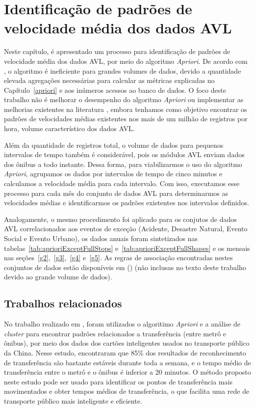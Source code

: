 \documentclass[
	12pt,				%
	oneside,			%
	a4paper,			%
	english,			%
	brazil				%
	]{abntex2ppgsi}
\begin{document}
{{{\section{Identificação de padrões de velocidade média dos dados AVL}
\label{expApriori}
Neste capítulo, é apresentado um processo para identificação de padrões de velocidade média dos dados AVL, por meio do algoritmo \textit{Apriori}. De acordo com \cite{xie2008optimization}, o algoritmo é ineficiente para grandes volumes de dados, devido a quantidade elevada agregações necessárias para calcular as métricas explicadas no Capítulo~\ref{apriori} e aos inúmeros acessos ao banco de dados. O foco deste trabalho não é melhorar o desempenho do algoritmo \textit{Apriori} ou implementar as melhorias existentes na literatura \cite{xie2008optimization, zhang2014method}, embora tenhamos como objetivo encontrar os padrões de velocidades médias existentes nos mais de um milhão de registros por hora, volume característico dos dados AVL.

Além da quantidade de registros total, o volume de dados para pequenos intervalos de tempo também é considerável, pois os módulos AVL enviam dados dos ônibus a todo instante. Dessa forma, para viabilizarmos o uso do algoritmo \textit{Apriori}, agrupamos os dados por intervalos de tempo de cinco minutos e calculamos a velocidade média para cada intervalo. Com isso, executamos esse processo para cada mês do conjunto de dados AVL para determinarmos as velocidades médias e identificarmos os padrões existentes nos intervalos definidos.

Analogamente, o mesmo procedimento foi aplicado para os conjutos de dados AVL correlacionados aos eventos de exceção (Acidente, Desastre Natural, Evento Social e Evento Urbano), os dados anuais foram sintetizados nas tabelas~\ref{tab:aprioriExceptFullStops} e~\ref{tab:aprioriExceptFullShapes} e os mensais nas seções~\ref{g2},~\ref{g3},~\ref{g4} e~\ref{g5}. As regras de associação encontradas nestes conjuntos de dados estão disponíveis em \citeauthor{fcas} (\citeyear{fcas}) (não inclusas no texto deste trabalho devido ao  grande volume de dados). 

\subsection{Trabalhos relacionados}

No trabalho realizado em \cite{zhao2019recognizing}, foram utilizados o algoritimo \textit{Apriori} e a análise de \textit{cluster} para encontrar padrões relacionados a transferência (entre metrô e ônibus), por meio dos dados dos cartões inteligentes usados no transporte público da China. Nesse estudo, encontraram que 85\% dos resultados de reconhecimento de transferência são bastante estáveis durante toda a semana, e o tempo médio de transferência entre o metrô e o ônibus é inferior a 20 minutos. O método proposto neste estudo pode ser usado para identificar os pontos de transferência mais movimentados e obter tempos médios de transferência, o que facilita uma rede de transporte público mais inteligente e eficiente.

}}}
\end{document}
